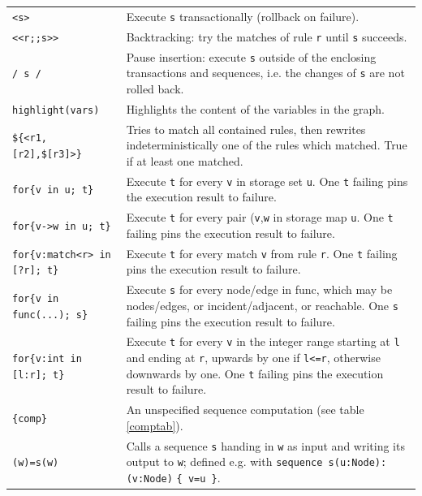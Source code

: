 \begin{table}[htbp]
\begin{minipage}{\linewidth} \renewcommand{\footnoterule}{} 
\begin{tabularx}{\linewidth}{|lX|}
\hline
\texttt{<s>}	& Execute \texttt{s} transactionally (rollback on failure).\\
\texttt{<<r;;s>>}	& Backtracking: try the matches of rule \texttt{r} until \texttt{s} succeeds.\\
\texttt{/ s /}	& Pause insertion: execute \texttt{s} outside of the enclosing transactions and sequences, i.e. the changes of \texttt{s} are not rolled back.\\
\hline
\texttt{highlight(vars)} & Highlights the content of the variables in the graph. \\
\hline
\texttt{\$\{<r1,[r2],\$[r3]>\}}	& Tries to match all contained rules, then rewrites indeterministically one of the rules which matched. True if at least one matched.\\
\hline
\texttt{for\{v in u; t\}}	& Execute \texttt{t} for every \texttt{v} in storage set \texttt{u}. One \texttt{t} failing pins the execution result to failure.\\
\texttt{for\{v->w in u; t\}}	& Execute \texttt{t} for every pair (\texttt{v},\texttt{w} in storage map \texttt{u}. One \texttt{t} failing pins the execution result to failure.\\
\texttt{for\{v:match<r> in [?r]; t\}}	& Execute \texttt{t} for every match \texttt{v} from rule \texttt{r}. One \texttt{t} failing pins the execution result to failure.\\
\texttt{for\{v in func(...); s\}}	& Execute \texttt{s} for every node/edge in func, which may be nodes/edges, or incident/adjacent, or reachable. One \texttt{s} failing pins the execution result to failure.\\
\texttt{for\{v:int in [l:r]; t\}}	& Execute \texttt{t} for every \texttt{v} in the integer range starting at \texttt{l} and ending at \texttt{r}, upwards by one if \texttt{l<=r}, otherwise downwards by one. One \texttt{t} failing pins the execution result to failure.\\
\hline
\texttt{\{comp\}}	& An unspecified sequence computation (see table \ref{comptab}).\\
\hline
\texttt{(w)=s(w)} & Calls a sequence \texttt{s} handing in \texttt{w} as input and writing its output to \texttt{w}; defined e.g. with \texttt{sequence s(u:Node):(v:Node)} \texttt{\{ v=u \}}.\\

\end{tabularx}
\end{minipage}
\end{table}
